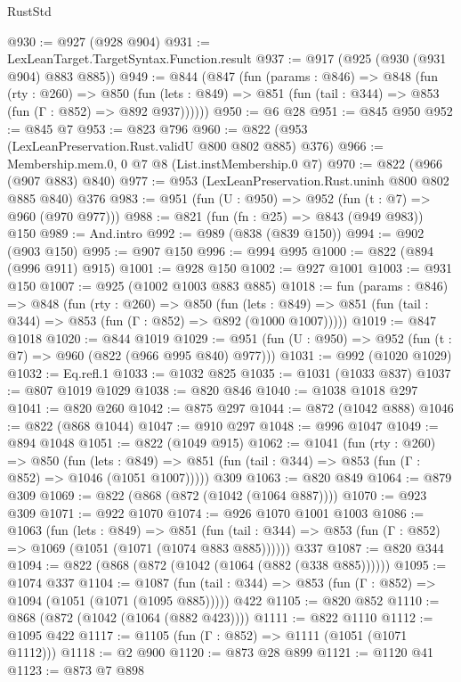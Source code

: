 \begin{lexlean}{RustStd}
\begin{coremodule}
{\begin{coremodule}
{{{{{{{{{@930 := @927 (@928 @904)
@931 := LexLeanTarget.TargetSyntax.Function.result
@937 := @917 (@925 (@930 (@931 @904) @883 @885))
@949 := @844
    (@847
      (fun (params : @846) =>
      @848
        (fun (rty : @260) =>
        @850
          (fun (lets : @849) => @851 (fun (tail : @344) => @853 (fun (Γ : @852) => @892 @937))))))
@950 := @6 @28
@951 := @845 @950
@952 := @845 @7
@953 := @823 @796
@960 := @822 (@953 (LexLeanPreservation.Rust.validU @800 @802 @885) @376)
@966 := Membership.mem.{0, 0} @7 @8 (List.instMembership.{0} @7)
@970 := @822 (@966 (@907 @883) @840)
@977 := @953 (LexLeanPreservation.Rust.uninh @800 @802 @885 @840) @376
@983 := @951 (fun (U : @950) => @952 (fun (t : @7) => @960 (@970 @977)))
@988 := @821 (fun (fn : @25) => @843 (@949 @983)) @150
@989 := And.intro
@992 := @989 (@838 (@839 @150))
@994 := @902 (@903 @150)
@995 := @907 @150
@996 := @994 @995
@1000 := @822 (@894 (@996 @911) @915)
@1001 := @928 @150
@1002 := @927 @1001
@1003 := @931 @150
@1007 := @925 (@1002 @1003 @883 @885)
@1018 := fun (params : @846) =>
  @848
    (fun (rty : @260) =>
    @850
      (fun (lets : @849) =>
      @851 (fun (tail : @344) => @853 (fun (Γ : @852) => @892 (@1000 @1007)))))
@1019 := @847 @1018
@1020 := @844 @1019
@1029 := @951 (fun (U : @950) => @952 (fun (t : @7) => @960 (@822 (@966 @995 @840) @977)))
@1031 := @992 (@1020 @1029)
@1032 := Eq.refl.{1}
@1033 := @1032 @825
@1035 := @1031 (@1033 @837)
@1037 := @807 @1019 @1029
@1038 := @820 @846
@1040 := @1038 @1018 @297
@1041 := @820 @260
@1042 := @875 @297
@1044 := @872 (@1042 @888)
@1046 := @822 (@868 @1044)
@1047 := @910 @297
@1048 := @996 @1047
@1049 := @894 @1048
@1051 := @822 (@1049 @915)
@1062 := @1041
    (fun (rty : @260) =>
    @850
      (fun (lets : @849) =>
      @851 (fun (tail : @344) => @853 (fun (Γ : @852) => @1046 (@1051 @1007)))))
    @309
@1063 := @820 @849
@1064 := @879 @309
@1069 := @822 (@868 (@872 (@1042 (@1064 @887))))
@1070 := @923 @309
@1071 := @922 @1070
@1074 := @926 @1070 @1001 @1003
@1086 := @1063
    (fun (lets : @849) =>
    @851 (fun (tail : @344) => @853 (fun (Γ : @852) => @1069 (@1051 (@1071 (@1074 @883 @885))))))
    @337
@1087 := @820 @344
@1094 := @822 (@868 (@872 (@1042 (@1064 (@882 (@338 @885))))))
@1095 := @1074 @337
@1104 := @1087
    (fun (tail : @344) => @853 (fun (Γ : @852) => @1094 (@1051 (@1071 (@1095 @885)))))
    @422
@1105 := @820 @852
@1110 := @868 (@872 (@1042 (@1064 (@882 @423))))
@1111 := @822 @1110
@1112 := @1095 @422
@1117 := @1105 (fun (Γ : @852) => @1111 (@1051 (@1071 @1112)))
@1118 := @2 @900
@1120 := @873 @28 @899
@1121 := @1120 @41
@1123 := @873 @7 @898
}}}}}}}}}
\end{coremodule}}
\end{coremodule}
\end{lexlean}

